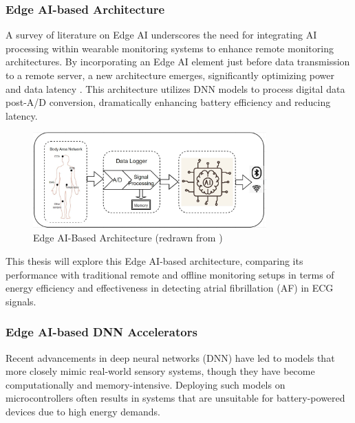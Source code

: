 \subsubsection{Edge AI-based Architecture}
\vspace{1em}
\noindent A survey of literature on Edge AI underscores the need for integrating AI processing within wearable monitoring systems to enhance remote monitoring architectures. By incorporating an Edge AI element just before data transmission to a remote server, a new architecture emerges, significantly optimizing power and data latency \cite{Muhoza2023, Shaik2023, Mujawar2020, Ashfaq2022}. This architecture utilizes DNN models to process digital data post-A/D conversion, dramatically enhancing battery efficiency and reducing latency.

\begin{figure}[h]
	\centering
	\includegraphics[width=0.8\textwidth]{images/ai on edge arch}
	\caption{Edge AI-Based Architecture (redrawn from \cite{Muhoza2023, Shaik2023, Mujawar2020, Ashfaq2022})}
	\label{fig:edge_ai_based_architecture}
\end{figure}

\noindent This thesis will explore this Edge AI-based architecture, comparing its performance with traditional remote and offline monitoring setups in terms of energy efficiency and effectiveness in detecting atrial fibrillation (AF) in ECG signals.\\

\subsubsection{Edge AI-based DNN Accelerators}
\vspace{1em}
\noindent Recent advancements in deep neural networks (DNN) have led to models that more closely mimic real-world sensory systems, though they have become computationally and memory-intensive. Deploying such models on microcontrollers often results in systems that are unsuitable for battery-powered devices due to high energy demands.\\

